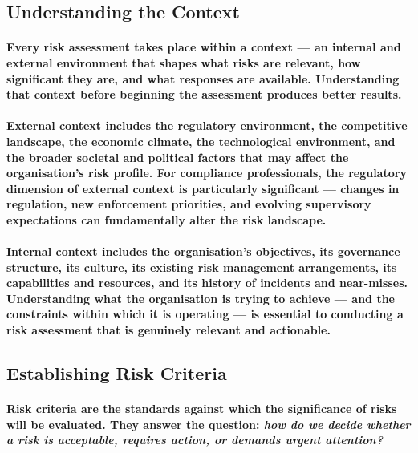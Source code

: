 \subsection{Understanding the Context}
\paragraph{Every risk assessment takes place within a context — an internal and external environment that shapes what risks are relevant, how significant they are, and what responses are available. Understanding that context before beginning the assessment produces better results.}
\paragraph{\textbf{External context} includes the regulatory environment, the competitive landscape, the economic climate, the technological environment, and the broader societal and political factors that may affect the organisation's risk profile. For compliance professionals, the regulatory dimension of external context is particularly significant — changes in regulation, new enforcement priorities, and evolving supervisory expectations can fundamentally alter the risk landscape.}
\paragraph{\textbf{Internal context} includes the organisation's objectives, its governance structure, its culture, its existing risk management arrangements, its capabilities and resources, and its history of incidents and near-misses. Understanding what the organisation is trying to achieve — and the constraints within which it is operating — is essential to conducting a risk assessment that is genuinely relevant and actionable.}

\subsection{Establishing Risk Criteria}
\paragraph{\textbf{Risk criteria} are the standards against which the significance of risks will be evaluated. They answer the question: \textit{how do we decide whether a risk is acceptable, requires action, or demands urgent attention?}}
